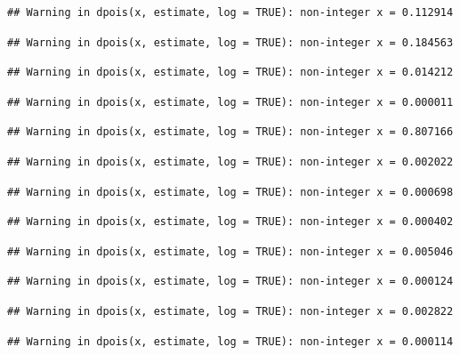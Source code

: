 \documentclass[]{article}
\begin{document}
\begin{verbatim}
## Warning in dpois(x, estimate, log = TRUE): non-integer x = 0.112914
\end{verbatim}

\begin{verbatim}
## Warning in dpois(x, estimate, log = TRUE): non-integer x = 0.184563
\end{verbatim}

\begin{verbatim}
## Warning in dpois(x, estimate, log = TRUE): non-integer x = 0.014212
\end{verbatim}

\begin{verbatim}
## Warning in dpois(x, estimate, log = TRUE): non-integer x = 0.000011
\end{verbatim}

\begin{verbatim}
## Warning in dpois(x, estimate, log = TRUE): non-integer x = 0.807166
\end{verbatim}

\begin{verbatim}
## Warning in dpois(x, estimate, log = TRUE): non-integer x = 0.002022
\end{verbatim}

\begin{verbatim}
## Warning in dpois(x, estimate, log = TRUE): non-integer x = 0.000698
\end{verbatim}

\begin{verbatim}
## Warning in dpois(x, estimate, log = TRUE): non-integer x = 0.000402
\end{verbatim}

\begin{verbatim}
## Warning in dpois(x, estimate, log = TRUE): non-integer x = 0.005046
\end{verbatim}

\begin{verbatim}
## Warning in dpois(x, estimate, log = TRUE): non-integer x = 0.000124
\end{verbatim}

\begin{verbatim}
## Warning in dpois(x, estimate, log = TRUE): non-integer x = 0.002822
\end{verbatim}

\begin{verbatim}
## Warning in dpois(x, estimate, log = TRUE): non-integer x = 0.000114
\end{verbatim}
\end{document}
